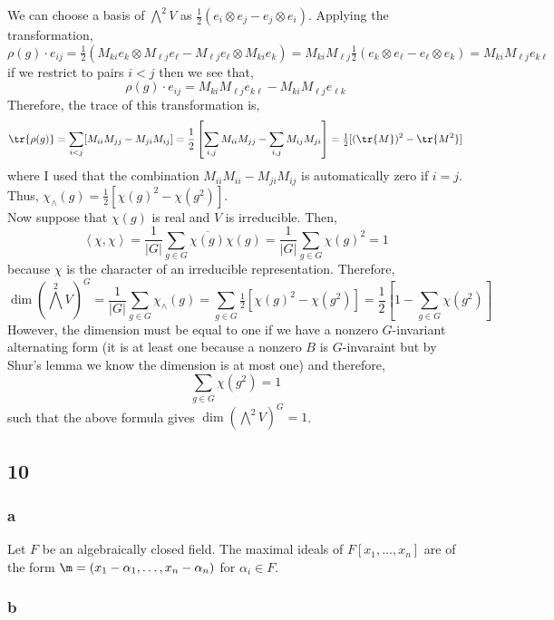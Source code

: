 \documentclass[12pt]{article}
\newcommand{\inner}[2]{\left< #1, #2 \right>}
\begin{document}
We can choose a basis of $\bigwedge^2 V$ as $\tfrac{1}{2} (e_i \otimes e_j - e_j \otimes e_i)$. Applying the transformation,
\[ \rho(g) \cdot e_{ij} = \tfrac{1}{2} (M_{ki} e_k \otimes M_{\ell j} e_\ell - M_{\ell j} e_\ell \otimes M_{ki} e_k) = M_{ki} M_{\ell j} \tfrac{1}{2} (e_k \otimes e_\ell - e_\ell \otimes e_k) = M_{ki} M_{\ell j} e_{k \ell} \]
if we restrict to pairs $i < j$ then we see that,
\[ \rho(g) \cdot e_{ij} = M_{ki} M_{\ell j} e_{k \ell} - M_{k i} M_{\ell j} e_{\ell k} \]
Therefore, the trace of this transformation is,
\[ \tr{\rho(g)} = \sum_{i < j} [M_{ii} M_{jj} - M_{ji} M_{ij}] = \frac{1}{2} \left[ \sum_{i,j} M_{ii} M_{jj} - \sum_{i,j} M_{ij} M_{ji} \right] = \tfrac{1}{2} [(\tr{M})^2 - \tr{M^2}] \]
where I used that the combination $M_{ii} M_{ii} - M_{ji} M_{ij}$ is automatically zero if $i = j$. Thus, $\chi_\wedge(g) = \tfrac{1}{2} [ \chi(g)^2 - \chi(g^2)]$. 
\bigskip\\
Now suppose that $\chi(g)$ is real and $V$ is irreducible. Then,
\[ \inner{\chi}{\chi} = \frac{1}{|G|} \sum_{g \in G} \overline{\chi(g)} \chi(g) = \frac{1}{|G|} \sum_{g \in G} \chi(g)^2 = 1 \]
because $\chi$ is the character of an irreducible representation. Therefore,
\[ \dim {\left( \bigwedge^2 V \right)^G} = \frac{1}{|G|} \sum_{g \in G} \chi_\wedge(g) = \sum_{g \in G} \tfrac{1}{2} [ \chi(g)^2 - \chi(g^2)] = \frac{1}{2} \left[ 1 - \sum_{g \in G} \chi(g^2) \right] \]
However, the dimension must be equal to one if we have a nonzero $G$-invariant alternating form (it is at least one because a nonzero $B$ is $G$-invaraint but by Shur's lemma we know the dimension is at most one) and therefore,
\[ \sum_{g \in G} \chi(g^2) = 1 \]
such that the above formula gives $\dim {(\bigwedge^2 V)^G} = 1$.

\subsection{10}

\subsubsection{a}

Let $F$ be an algebraically closed field. The maximal ideals of $F[x_1, \dots, x_n]$ are of the form $\m = (x_1 - \alpha_1, \dots, x_n - \alpha_n)$ for $\alpha_i \in F$.

\subsubsection{b}
\end{document}

